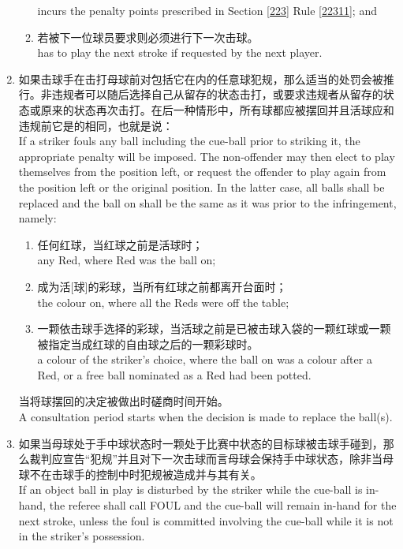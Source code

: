 \begin{enumerate}[label=(\alph*)]
\begin{enumerate}[label=(\roman*)]
        incurs the penalty points prescribed in Section \ref{223} Rule \ref{22311}; and
        \item 若被下一位球员要求则必须进行下一次击球。\\
        has to play the next stroke if requested by the next player.
    \end{enumerate}
    \item \label{22310i}如果击球手在击打母球前对包括它在内的任意球犯规，那么适当的处罚会被推行。非违规者可以随后选择自己从留存的状态击打，或要求违规者从留存的状态或原来的状态再次击打。在后一种情形中，所有球都应被摆回并且活球应和违规前它是的相同，也就是说：\\
    If a striker fouls any ball including the cue-ball prior to striking it, the appropriate penalty will be imposed. The non-offender may then elect to play themselves from the position left, or request the offender to play again from the position left or the original position. In the latter case, all balls shall be replaced and the ball on shall be the same as it was prior to the infringement, namely:
    \begin{enumerate}[label=(\roman*)]
        \item 任何红球，当红球之前是活球时；\\
        any Red, where Red was the ball on;
        \item 成为活[球]的彩球，当所有红球之前都离开台面时；\\
        the colour on, where all the Reds were off the table;
        \item 一颗依击球手选择的彩球，当活球之前是已被击球入袋的一颗红球或一颗被指定当成红球的自由球之后的一颗彩球时。\\
        a colour of the striker's choice, where the ball on was a colour after a Red, or a free ball nominated as a Red had been potted.
    \end{enumerate}
    当将球摆回的决定被做出时磋商时间开始。\\
    A consultation period starts when the decision is made to replace the ball(s).
    \item 如果当母球处于手中球状态时一颗处于比赛中状态的目标球被击球手碰到，那么裁判应宣告``犯规''并且对下一次击球而言母球会保持手中球状态，除非当母球不在击球手的控制中时犯规被造成并与其有关。\\
    If an object ball in play is disturbed by the striker while the cue-ball is in-hand, the referee shall call FOUL and the cue-ball will remain in-hand for the next stroke, unless the foul is committed involving the cue-ball while it is not in the striker's possession.
\end{enumerate}

